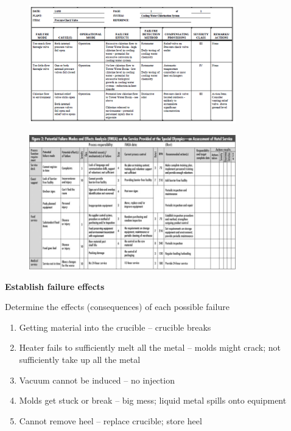\documentclass[aspectratio=1610,pdftex,dvipsnames,compress,xcolor={dvipsnames}]{beamer}
\begin{document}
\addtocounter{framenumber}{-1}
\begin{frame}{}
    \begin{figure}
        \centering
        \includegraphics[width=0.80\textwidth]{pressure.check.valve.jpg}
    \end{figure}
\end{frame}


\begin{frame}{}
    \begin{figure}
        \centering
        \includegraphics[width=0.80\textwidth]{hotel.service.jpg}
    \end{figure}
\end{frame}


\begin{frame}[plain]{}
    \centering\LARGE\textbf{Establish failure effects}
\end{frame}


\addtocounter{framenumber}{-1}
\begin{frame}{Determine the effects (consequences) of each possible failure}
    \begin{enumerate}[series=outerlist,topsep=0pt,itemsep=21pt,leftmargin=*,label=(\arabic*)]
        \item[]Getting material into the crucible -- crucible breaks
        \item[]Heater fails to sufficiently melt all the metal -- molds might crack; not sufficiently take up all the metal
        \item[]Vacuum cannot be induced -- no injection
        \item[]Molds get stuck or break -- big mess; liquid metal spills onto equipment
        \item[]Cannot remove heel -- replace crucible; store heel
    \end{enumerate}
\end{frame}
\end{document}
